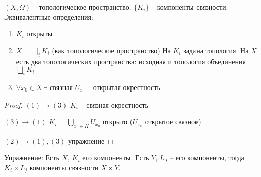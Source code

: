 \documentclass[main]{subfiles}
\begin{document}
\begin{theorem}
    $(X, \Omega)$ -- топологическое пространство. $\{K_i\}$ -- компоненты связности.
    Эквивалентные определения:
    \begin{enumerate}
        \item $K_i$ открыты
        \item $X = \bigsqcup_i K_i$ (как топологическое пространство)
              На $K_i$ задана топология. На $X$ есть два топологических пространства: исходная и топология объединения $\bigsqcup_i K_i$
        \item $\forall x_0 \in X\ \exists$ связная $U_{x_0}$ -- открытая окрестность
    \end{enumerate}
\end{theorem}
\begin{proof}
    $(1) \to (3)$ $K_i$ -- связная окрестность

    $(3) \to (1)$ $K_i = \bigcup_{x_0 \in K} U_{x_0}$ открыто ($U_{x_0}$ открытое связное)

    $(2) \to (1), (3)$ упражнение
\end{proof}
Упражнение: Есть $X$, $K_i$ его компоненты. Есть $Y$, $L_J$ -- его компоненты, тогда $K_i \times L_j$ компоненты связности $X \times Y$.
\end{document}
